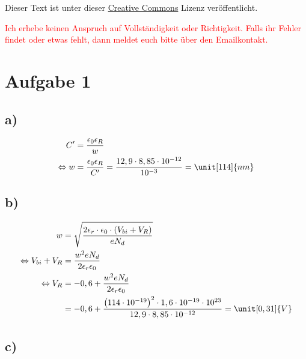 




\maketitle

Dieser Text ist unter dieser \href{http://creativecommons.org/licenses/by-nc-sa/4.0/}{Creative Commons} Lizenz veröffentlicht.

\textcolor{red}{Ich erhebe keinen Anspruch auf Vollständigkeit oder Richtigkeit. Falls ihr Fehler findet oder etwas fehlt, dann meldet euch bitte über den Emailkontakt.}

\tableofcontents


\newpage



\section{Aufgabe 1}

\subsection*{a)}

\begin{align*}
C' &= \frac{\epsilon_0 \epsilon_R}{w} \\
\Leftrightarrow w &= \frac{\epsilon_0 \epsilon_R}{C'} = \frac{12,9 \cdot 8,85 \cdot 10^{-12}}{10^{-3}} = \unit[114]{nm}
\end{align*}


\subsection*{b)}

\begin{align*}
w &= \sqrt{\frac{2 \epsilon_r \cdot \epsilon_0 \cdot \left( V_{bi} + V_R \right)}{e N_d}} \\
\Leftrightarrow V_{bi} + V_R &= \frac{w^2 e N_d}{2 \epsilon_r \epsilon_0} \\
\Leftrightarrow V_R &= -0,6 + \frac{w^2 e N_d}{2 \epsilon_r \epsilon_0} \\
&= -0,6 + \frac{\left( 114 \cdot 10^{-19} \right)^2 \cdot 1,6 \cdot 10^{-19} \cdot 10^{23}}{12,9 \cdot 8,85 \cdot 10^{-12}} = \unit[0,31]{V}
\end{align*}


\subsection*{c)}

